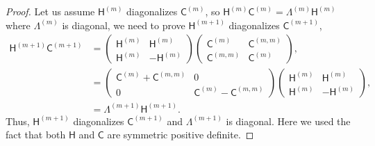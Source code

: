 \documentclass{iitthesis}          %
\newcommand{\mSigma}{\mathsf{\Sigma}}
\newcommand{\mB}{\mathsf{B}}
\newcommand{\mA}{\mathsf{A}}
\newcommand{\mC}{\mathsf{C}}
\newcommand{\mH}{\mathsf{H}}
\newcommand{\mLambda}{\mathsf{\Lambda}}
\newcommand{\mV}{\mathsf{V}}
\begin{document}
\begin{proof}
Let us assume $\mH^{(m)}$ diagonalizes $\mC^{(m)}$, so $\mH^{(m)} \mC^{(m)} = \Lambda^{(m)} \mH^{(m)}$ where $\Lambda^{(m)}$ is diagonal, we need to prove $\mH^{(m+1)}$ diagonalizes $\mC^{(m+1)}$,
\begin{align*}
\mH^{(m+1)} \mC^{(m+1)} &= 
\begin{pmatrix}
\mH^{(m)} & \mH^{(m)} \\ \mH^{(m)} & -\mH^{(m)}
\end{pmatrix}
\begin{pmatrix}
\mC^{(m)} & \mC^{(m,m)} \\ \mC^{(m,m)} & \mC^{(m)}
\end{pmatrix},
\\
& = 
\begin{pmatrix}
\mC^{(m)} + \mC^{(m,m)} & 0 \\ 0 & \mC^{(m)} - \mC^{(m,m)}
\end{pmatrix}
\begin{pmatrix}
\mH^{(m)} & \mH^{(m)} \\ \mH^{(m)} & -\mH^{(m)}
\end{pmatrix},
\\ 
& = \Lambda^{(m+1)} \mH^{(m+1)} .
\end{align*}
Thus, $\mH^{(m+1)}$ diagonalizes $\mC^{(m+1)}$ and $\Lambda^{(m+1)}$ is diagonal. Here we used the fact that both $\mH$ and $\mC$ are symmetric positive definite.
\end{proof}

\end{document}
